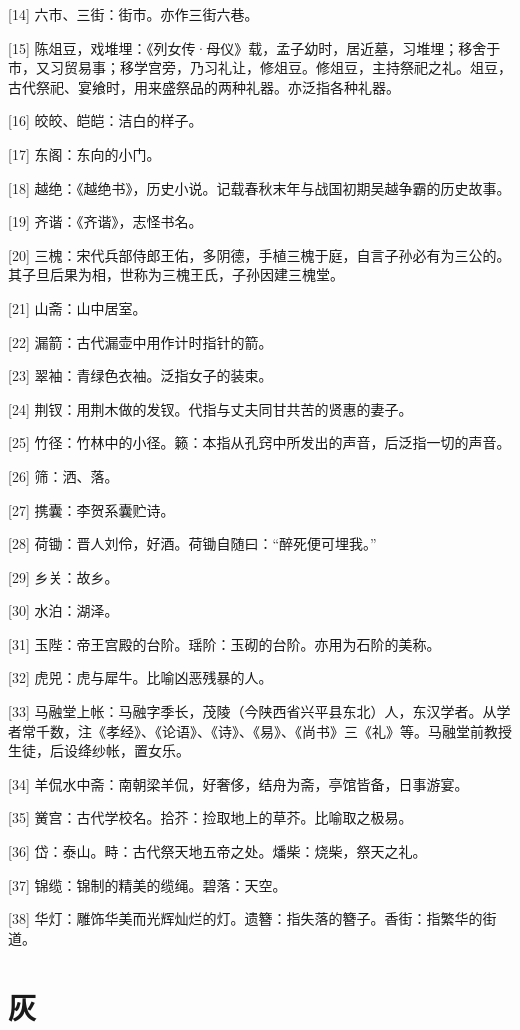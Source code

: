 \documentclass[12pt,UTF8]{ctexbook}
\begin{document}
[14] 六市、三街：街市。亦作三街六巷。

[15] 陈俎豆，戏堆埋：《列女传·母仪》载，孟子幼时，居近墓，习堆埋；移舍于市，又习贸易事；移学宫旁，乃习礼让，修俎豆。修俎豆，主持祭祀之礼。俎豆，古代祭祀、宴飨时，用来盛祭品的两种礼器。亦泛指各种礼器。

[16] 皎皎、皑皑：洁白的样子。

[17] 东阁：东向的小门。

[18] 越绝：《越绝书》，历史小说。记载春秋末年与战国初期吴越争霸的历史故事。

[19] 齐谐：《齐谐》，志怪书名。

[20] 三槐：宋代兵部侍郎王佑，多阴德，手植三槐于庭，自言子孙必有为三公的。其子旦后果为相，世称为三槐王氏，子孙因建三槐堂。

[21] 山斋：山中居室。

[22] 漏箭：古代漏壶中用作计时指针的箭。

[23] 翠袖：青绿色衣袖。泛指女子的装束。

[24] 荆钗：用荆木做的发钗。代指与丈夫同甘共苦的贤惠的妻子。

[25] 竹径：竹林中的小径。籁：本指从孔窍中所发出的声音，后泛指一切的声音。

[26] 筛：洒、落。

[27] 携囊：李贺系囊贮诗。

[28] 荷锄：晋人刘伶，好酒。荷锄自随曰：“醉死便可埋我。”

[29] 乡关：故乡。

[30] 水泊：湖泽。

[31] 玉陛：帝王宫殿的台阶。瑶阶：玉砌的台阶。亦用为石阶的美称。

[32] 虎兕：虎与犀牛。比喻凶恶残暴的人。

[33] 马融堂上帐：马融字季长，茂陵（今陕西省兴平县东北）人，东汉学者。从学者常千数，注《孝经》、《论语》、《诗》、《易》、《尚书》三《礼》等。马融堂前教授生徒，后设绛纱帐，置女乐。

[34] 羊侃水中斋：南朝梁羊侃，好奢侈，结舟为斋，亭馆皆备，日事游宴。

[35] 黉宫：古代学校名。拾芥：捡取地上的草芥。比喻取之极易。

[36] 岱：泰山。畤：古代祭天地五帝之处。燔柴：烧柴，祭天之礼。

[37] 锦缆：锦制的精美的缆绳。碧落：天空。

[38] 华灯：雕饰华美而光辉灿烂的灯。遗簪：指失落的簪子。香街：指繁华的街道。





\chapter{灰}
\end{document}
